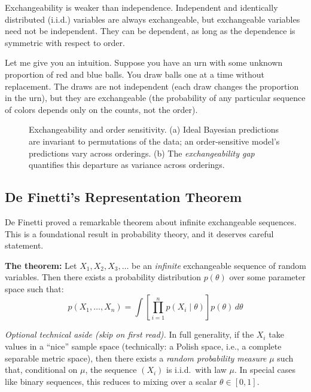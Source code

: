 Exchangeability is weaker than independence. Independent and identically distributed (i.i.d.) variables are always exchangeable, but exchangeable variables need not be independent. They can be dependent, as long as the dependence is symmetric with respect to order.

Let me give you an intuition. Suppose you have an urn with some unknown proportion of red and blue balls. You draw balls one at a time without replacement. The draws are not independent (each draw changes the proportion in the urn), but they are exchangeable (the probability of any particular sequence of colors depends only on the counts, not the order).

\begin{figure}[t]
\centering

\caption{Exchangeability and order sensitivity. (a) Ideal Bayesian predictions are invariant to permutations of the data; an order-sensitive model's predictions vary across orderings. (b) The \emph{exchangeability gap} quantifies this departure as variance across orderings.}
\label{fig:exchangeability}
\end{figure}

\subsection{De Finetti's Representation Theorem}

De Finetti proved a remarkable theorem about infinite exchangeable sequences. This is a foundational result in probability theory, and it deserves careful statement.

\textbf{The theorem:} Let $X_1, X_2, X_3, \ldots$ be an \emph{infinite} exchangeable sequence of random variables. Then there exists a probability distribution $p(\theta)$ over some parameter space such that:
\begin{equation}
p(X_1, \ldots, X_n) = \int \left[\prod_{i=1}^{n} p(X_i \mid \theta)\right] p(\theta) \, d\theta
\end{equation}

\vspace{0.5em}
\noindent\textit{Optional technical aside (skip on first read).} In full generality, if the $X_i$ take values in a ``nice'' sample space (technically: a Polish space, i.e., a complete separable metric space), then there exists a \emph{random probability measure} $\mu$ such that, conditional on $\mu$, the sequence $(X_i)$ is i.i.d.\ with law $\mu$. In special cases like binary sequences, this reduces to mixing over a scalar $\theta\in[0,1]$.



